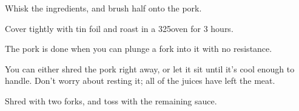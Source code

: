 \begin{recipe}
Whisk the ingredients, and brush half onto the pork.

Cover tightly with tin foil and roast in a 325\degree oven for 3 hours.

The pork is done when you can plunge a fork into it with no resistance.

You can either shred the pork right away, or let it sit until it's cool enough to handle. Don't worry about resting it; all of the juices have left the meat.

Shred with two forks, and toss with the remaining sauce.

\end{recipe}
